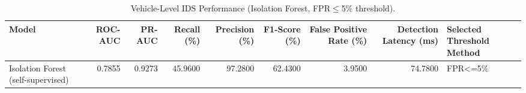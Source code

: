 \begin{table}[t]
\centering
\begin{tabular}{lrrrrrrrl}
\toprule
Model & ROC-AUC & PR-AUC & Recall (\%) & Precision (\%) & F1-Score (\%) & False Positive Rate (\%) & Detection Latency (ms) & Selected Threshold Method \\
\midrule
Isolation Forest (self-supervised) & 0.7855 & 0.9273 & 45.9600 & 97.2800 & 62.4300 & 3.9500 & 74.7800 & FPR<=5\% \\
\bottomrule
\end{tabular}
\caption{Vehicle-Level IDS Performance (Isolation Forest, FPR$\leq$5\% threshold).}
\label{tab:vehicle-level-ids}
\end{table}
